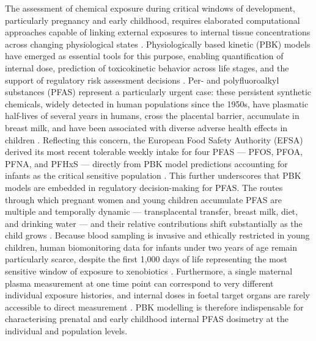 \documentclass[preprint,12pt]{elsarticle}
\begin{document}
\begin{linenumbers}
The assessment of chemical exposure during critical windows of development, particularly pregnancy and early childhood, requires elaborated computational approaches capable of linking external exposures to internal tissue concentrations across changing physiological states \cite{ratier2024,brochot2019,deepika2025}. 
Physiologically based kinetic (PBK) models have emerged as essential tools for this purpose, enabling quantification of internal dose, prediction of toxicokinetic behavior across life stages, and the support of regulatory risk assessment decisions \citep{beaudouin2010,deepika2022,beaudouin2024,brochot2019}. 
Per- and polyfluoroalkyl substances (PFAS) represent a particularly urgent case: these persistent synthetic chemicals, widely detected in human populations since the 1950s, have plasmatic half-lives of several years in humans, cross the placental barrier, accumulate in breast milk, and have been associated with diverse adverse health effects in children \citep{domingo2025,sunderland2019,lu2024,deSilva2021,panieri2022, habib2024,fenton2021,hasan2025,dehghani2025,kirk2018}. 
Reflecting this concern, the European Food Safety Authority (EFSA) derived its most recent tolerable weekly intake for four PFAS — PFOS, PFOA, PFNA, and PFHxS — directly from PBK model predictions accounting for infants as the critical sensitive population \citep{EFSA2020,deepika2025}. This further underscores that PBK models are embedded in regulatory decision-making for PFAS. The routes through which pregnant women and young children accumulate PFAS are multiple and temporally dynamic — transplacental transfer, breast milk, diet, and drinking water — and their relative contributions shift substantially as the child grows \citep{brochot2019,ratier2024}. 
Because blood sampling is invasive and ethically restricted in young children, human biomonitoring data for infants under two years of age remain particularly scarce, despite the first 1,000 days of life representing the most sensitive window of exposure to xenobiotics \citep{silveira2007,dePaula2026,jamnik2022,arbuckle2010}.
Furthermore, a single maternal plasma measurement at one time point can correspond to very different individual exposure histories, and internal doses in foetal target organs are rarely accessible to direct measurement \citep{brochot2019}. 
PBK modelling is therefore indispensable for characterising prenatal and early childhood internal PFAS dosimetry at the individual and population levels.


\end{linenumbers}
\end{document}
